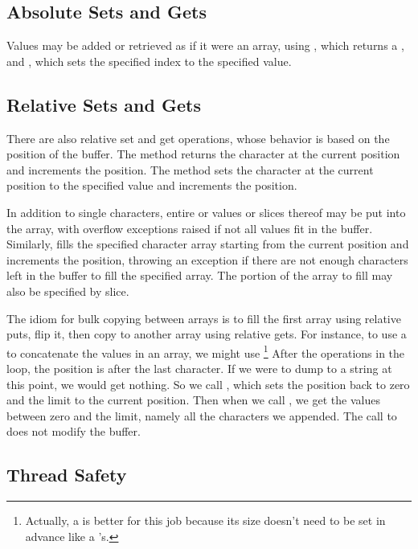 \subsection{Absolute Sets and Gets}

Values may be added or retrieved as if it were an array, using
, which returns a
, and , which sets the specified index
to the specified  value.

\subsection{Relative Sets and Gets}

There are also relative set and get operations, whose behavior is
based on the position of the buffer.  The  method returns
the character at the current position and increments the position.
The  method sets the character at the current position
to the specified value and increments the position.  

In addition to single characters, entire  or
 values or slices thereof may be put into the array, with
overflow exceptions raised if not all values fit in the buffer.
Similarly,  fills the specified character array
starting from the current position and increments the position,
throwing an exception if there are not enough characters left in the
buffer to fill the specified array.  The portion of the array to fill
may also be specified by slice.

The idiom for bulk copying between arrays is to fill the first array
using relative puts, flip it, then copy to another array using
relative gets.  For instance, to use a  to concatenate
the values in an array, we might use%
%
\footnote{Actually, a  is better for this job
because its size doesn't need to be set in advance like a
's.}%
%
%
After the  operations in the loop, the position is
after the last character.  If we were to dump to a string at this
point, we would get nothing.  So we call , which
sets the position back to zero and the limit to the current
position.  Then when we call , we get the values
between zero and the limit, namely all the characters we appended.
The call to  does not modify the buffer.

\subsection{Thread Safety}

